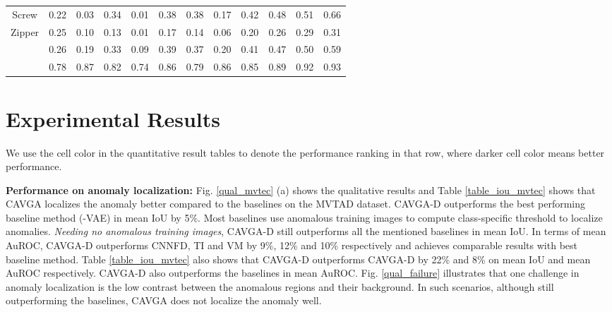\documentclass[runningheads]{llncs}
\begin{document}
\begin{table}[t]
\begin{center}
\begin{tabular}{cccccccccccc}
Screw &\cellcolor{blue!25}0.22    &\cellcolor{blue!15}0.03  &\cellcolor{blue!30}0.34 &\cellcolor{blue!10}0.01 &\cellcolor{blue!40}0.38 &\cellcolor{blue!40}0.38    &\cellcolor{blue!20}0.17  &\cellcolor{blue!50}0.42 &  \cellcolor{blue!60}0.48 &\cellcolor{blue!70}0.51 &\cellcolor{blue!80}\color{white}0.66\\
Zipper &\cellcolor{blue!50}0.25    &\cellcolor{blue!15}0.10  &\cellcolor{blue!20}0.13 &\cellcolor{blue!5}0.01 &\cellcolor{blue!30}0.17 &\cellcolor{blue!25}0.14    &\cellcolor{blue!10}0.06 &\cellcolor{blue!40}0.20  &\cellcolor{blue!60}0.26 &\cellcolor{blue!70}0.29 &\cellcolor{blue!80}\color{white}0.31\\
\midrule
 &\cellcolor{blue!20}0.26  &\cellcolor{blue!10}0.19 &\cellcolor{blue!25}0.33 &\cellcolor{blue!5}0.09 &\cellcolor{blue!40}0.39 &\cellcolor{blue!30}0.37 &\cellcolor{blue!15}0.20  &\cellcolor{blue!50}0.41 &\cellcolor{blue!60}0.47 &\cellcolor{blue!70}0.50 &\cellcolor{blue!80}\color{white}0.59\\
\midrule
 &\cellcolor{blue!15}0.78 &\cellcolor{blue!50}0.87 &\cellcolor{blue!25}0.82 &\cellcolor{blue!10}0.74 &\cellcolor{blue!40}0.86 &\cellcolor{blue!20}0.79 &\cellcolor{blue!40}0.86  &\cellcolor{blue!30}0.85 &\cellcolor{blue!60}0.89 &\cellcolor{blue!70}0.92 &\cellcolor{blue!80}\color{white}0.93\\
\bottomrule
\end{tabular}
\end{center}
\end{table}




\section{Experimental Results}
\label{comparisions_details}


We use the cell color in the quantitative result tables to denote the performance ranking in that row, where darker cell color means better performance.

\textbf{Performance on anomaly localization:} Fig. \ref{qual_mvtec} (a) shows the qualitative results and Table \ref{table_iou_mvtec} shows that CAVGA localizes the anomaly better compared to the baselines on the MVTAD dataset. CAVGA-D outperforms the best performing baseline method (-VAE) in mean IoU by 5\%. Most baselines use anomalous training images to compute class-specific threshold to localize anomalies. \textit{Needing no anomalous training images}, CAVGA-D still outperforms all the mentioned baselines in mean IoU. In terms of mean AuROC, CAVGA-D outperforms CNNFD, TI and VM by 9\%, 12\% and 10\% respectively and achieves comparable results with best baseline method.  Table \ref{table_iou_mvtec} also shows that CAVGA-D outperforms CAVGA-D by 22\% and 8\% on mean IoU and mean AuROC respectively. CAVGA-D also outperforms the baselines in mean AuROC. Fig. \ref{qual_failure} illustrates that one challenge in anomaly localization is the  low contrast between the anomalous regions and their background. In such scenarios, although still outperforming the baselines, CAVGA does not localize the anomaly well.
\end{document}
